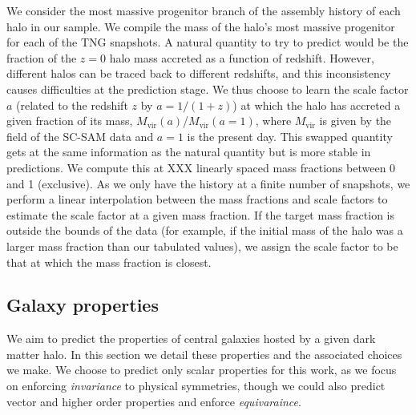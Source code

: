 We consider the most massive progenitor branch of the assembly history of each \dark halo in our sample.
We compile the mass of the halo's most massive progenitor for each of the TNG snapshots. 
A natural quantity to try to predict would be the fraction of the $z=0$ halo mass accreted as a function of redshift.
However, different halos can be traced back to different redshifts, and this inconsistency causes difficulties at the prediction stage.
We thus choose to learn the scale factor $a$ (related to the redshift $z$ by $a=1/(1+z)$) at which the halo has accreted a given fraction of its mass, $M_\mathrm{vir}(a)$/$M_\mathrm{vir}(a=1)$, where $M_\mathrm{vir}$ is given by the  field of the SC-SAM data and $a=1$ is the present day.
This swapped quantity gets at the same information as the natural quantity but is more stable in predictions.
We compute this at XXX linearly spaced mass fractions between 0 and 1 (exclusive). 
As we only have the history at a finite number of snapshots, we perform a linear interpolation between the mass fractions and scale factors to estimate the scale factor at a given mass fraction.
If the target mass fraction is outside the bounds of the data (for example, if the initial mass of the halo was a larger mass fraction than our tabulated values), we assign the scale factor to be that at which the mass fraction is closest.  



\subsection{Galaxy properties}
\label{sec:galprops}

We aim to predict the properties of central galaxies hosted by a given dark matter halo.
In this section we detail these properties and the associated choices we make. 
We choose to predict only scalar properties for this work, as we focus on enforcing \emph{invariance} to physical symmetries, though we could also predict vector and higher order properties and enforce \emph{equivaraince}.

